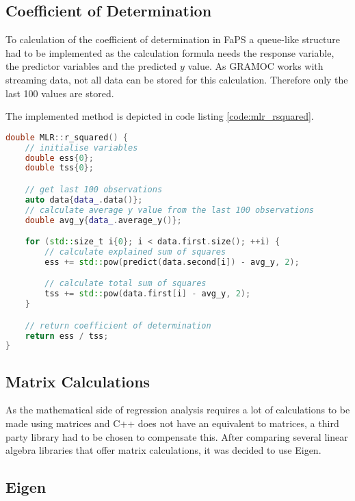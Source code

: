 \subsection{Coefficient of Determination}

To calculation of the coefficient of determination in FaPS a queue-like structure had to be implemented as the calculation formula needs the response variable, the predictor variables and the predicted $ y $ value. As GRAMOC works with streaming data, not all data can be stored for this calculation. Therefore only the last 100 values are stored.

The implemented method is depicted in code listing \vref{code:mlr_rsquared}.

\begin{minipage}{\textwidth}
\begin{lstlisting}[caption={C++ method to calculate the coefficient of determination},captionpos=b,label={code:mlr_rsquared},language=C++]
double MLR::r_squared() {
    // initialise variables
    double ess{0};
    double tss{0};

    // get last 100 observations
    auto data{data_.data()};
    // calculate average y value from the last 100 observations
    double avg_y{data_.average_y()};

    for (std::size_t i{0}; i < data.first.size(); ++i) {
        // calculate explained sum of squares
        ess += std::pow(predict(data.second[i]) - avg_y, 2);

        // calculate total sum of squares
        tss += std::pow(data.first[i] - avg_y, 2);
    }

    // return coefficient of determination
    return ess / tss;
}
\end{lstlisting}
\end{minipage}

\subsection{Matrix Calculations}

As the mathematical side of regression analysis requires a lot of calculations to be made using matrices and C++ does not have an equivalent to matrices, a third party library had to be chosen to compensate this. After comparing several linear algebra libraries that offer matrix calculations, it was decided to use Eigen.

\subsection{Eigen}

